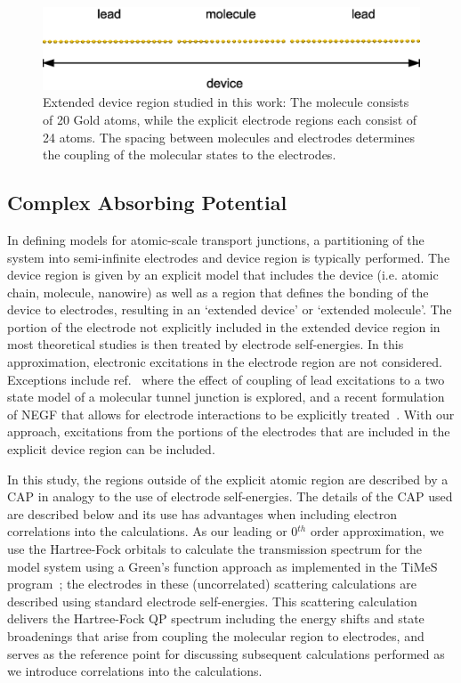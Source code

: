 \begin{figure}
	\begin{center}
		\includegraphics[width=0.9\linewidth]{figures/figure1}
	\end{center}
	\caption{Extended device region studied in this work: The molecule
	consists of 20 Gold atoms, while the explicit electrode regions
	each consist of 24 atoms. The spacing between molecules and electrodes
	determines the coupling of the molecular states to the electrodes.}
	\label{fig:chaincapdevice}
\end{figure}

\subsection{Complex Absorbing Potential}
\label{subsec:CAP}

In defining models for atomic-scale transport junctions, a partitioning
of the system into semi-infinite electrodes and device region is typically
performed. The device region is given by an explicit model that includes
the device (i.e. atomic chain, molecule, nanowire) as well as a region
that defines the bonding of the device to electrodes, resulting in an
`extended device' or `extended molecule'. The portion of the
electrode not explicitly included in the extended device region in
most theoretical studies is then treated by electrode self-energies. In this
approximation, electronic excitations in the electrode region are not
considered. Exceptions include ref.~\cite{galperin_nitzan2006leadexcitations}
where the effect of coupling of lead excitations to a two state model of
a molecular tunnel junction is explored, and a recent formulation
of \ac{NEGF} that allows for electrode interactions to be explicitly
treated~\cite{ness_dash_prb}.
With our approach, excitations from the portions of the electrodes that
are included in the explicit device region can be included.

In this study, the regions outside of the explicit atomic region are
described by a \ac{CAP} in analogy to the use of electrode self-energies.
The details of the \ai \ac{CAP} used are described below and its use has
advantages when including electron correlations into the calculations.
As our leading or 0$^{th}$ order approximation, we use the Hartree-Fock
orbitals to calculate the transmission spectrum for the model system using
a Green's function approach  as implemented in the TiMeS program~\cite{times};
the electrodes in these (uncorrelated) scattering calculations are
described using standard electrode  self-energies. This scattering
calculation delivers the Hartree-Fock \ac{QP} spectrum including
the energy shifts and state broadenings that arise from coupling the molecular
region to electrodes, and serves as the reference point for discussing
subsequent calculations performed as we introduce correlations into the
calculations. 

